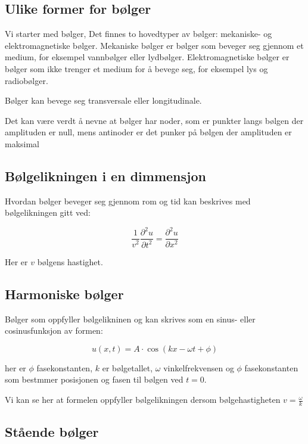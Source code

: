 \homeworkProblem{}
\subsection*{Ulike former for bølger}

Vi starter med bølger, Det finnes to hovedtyper av bølger: mekaniske- og elektromagnetiske bølger. Mekaniske bølger er bølger som beveger seg gjennom et medium, for eksempel vannbølger eller lydbølger. Elektromagnetiske bølger er bølger som ikke trenger et medium for å bevege seg, for eksempel lys og radiobølger.

Bølger kan bevege seg transversale eller longitudinale.

Det kan være verdt å nevne at bølger har noder, som er punkter langs bølgen der amplituden er null, mens antinoder er det punker på bølgen der amplituden er maksimal

\subsection*{Bølgelikningen i en dimmensjon}

Hvordan bølger beveger seg gjennom rom og tid kan beskrives med bølgelikningen gitt ved:

\begin{equation*}
    \frac{1}{v^2}\frac{\partial^2 u}{\partial t^2}=\frac{\partial^2 u}{\partial x^2}
\end{equation*}

Her er $v$ bølgens hastighet.

\subsection*{Harmoniske bølger}

Bølger som oppfyller bølgelikninen og kan skrives som en sinus- eller cosinusfunksjon av formen:

\begin{equation*}
    u(x,t)=A\cdot \cos (kx-\omega t + \phi) 
\end{equation*}

her er $\phi$ fasekonstanten, $k$ er bølgetallet, $\omega$ vinkelfrekvensen og $\phi$ fasekonstanten som bestmmer posisjonen og fasen til bølgen ved $t=0$.

Vi kan se her at formelen oppfyller bølgelikningen dersom bølgehastigheten $v=\frac{\omega}{k}$

\subsection*{Stående bølger}

